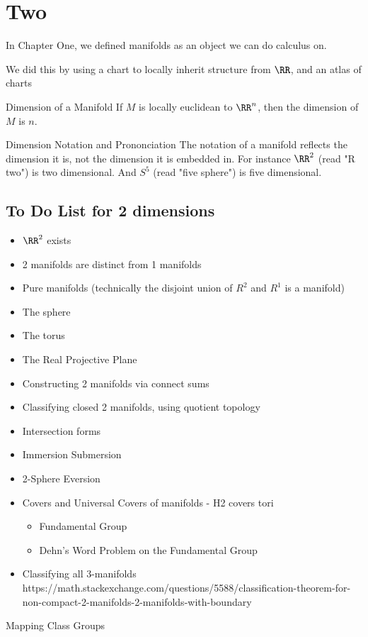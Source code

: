 \chapter*{Two}


In Chapter One, we defined manifolds as an object we can do calculus on.

We did this by using a chart to locally inherit structure from \( \RR \),
    and an atlas of charts 


\begin{boxDefinition}{Dimension of a Manifold}
    If \( M \) is locally euclidean to \( \RR^n \), then the dimension of \( M \) is \( n \).
\end{boxDefinition}
\begin{boxNote}{Dimension Notation and Prononciation}
    The notation of a manifold reflects the dimension it is, not the dimension it is embedded in.
    For instance \( \RR^2 \) (read "R two") is two dimensional.
    And \( S^5 \) (read "five sphere") is five dimensional.
\end{boxNote}
\begin{boxTheorem}{}
\end{boxTheorem}

\section{To Do List for 2 dimensions}
\begin{boxTODO}{}
\begin{itemize}
\item \( \RR^2 \) exists
\item 2 manifolds are distinct from 1 manifolds
\item Pure manifolds (technically the disjoint union of \(R^2\) and \(R^1\) is a manifold)
\item The sphere
\item The torus
\item The Real Projective Plane
\item Constructing 2 manifolds via connect sums
\item Classifying closed 2 manifolds, using quotient topology
\item Intersection forms
\item Immersion Submersion
\item 2-Sphere Eversion
\item Covers and Universal Covers of manifolds - H2 covers tori
\begin{itemize}
    \item Fundamental Group
    \item Dehn's Word Problem on the Fundamental Group
\end{itemize}
\item Classifying all 3-manifolds https://math.stackexchange.com/questions/5588/classification-theorem-for-non-compact-2-manifolds-2-manifolds-with-boundary
\end{itemize}

    Mapping Class Groups

\end{boxTODO}
